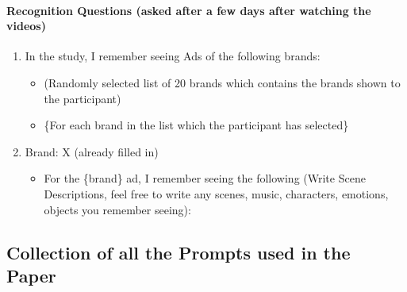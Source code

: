 \paragraph{Recognition Questions (asked after a few days after watching the videos)}
\begin{enumerate}
    \item In the study, I remember seeing Ads of the following brands:
    \begin{itemize}
        \item (Randomly selected list of 20 brands which contains the brands shown to the participant)
        \item \{For each brand in the list which the participant has selected\}
    \end{itemize}
    
    \item Brand: X (already filled in)
    \begin{itemize}
        \item For the \{brand\} ad, I remember seeing the following (Write Scene Descriptions, feel free to write any scenes, music, characters, emotions, objects you remember seeing):
    \end{itemize}
\end{enumerate}





\subsection{Collection of all the Prompts used in the Paper}

